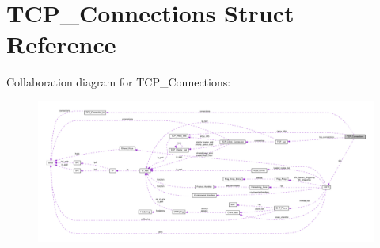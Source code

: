 \hypertarget{struct_t_c_p___connections}{\section{T\+C\+P\+\_\+\+Connections Struct Reference}
\label{struct_t_c_p___connections}
}


Collaboration diagram for T\+C\+P\+\_\+\+Connections\+:
\nopagebreak
\begin{figure}[H]
\begin{center}
\leavevmode
\includegraphics[width=350pt]{struct_t_c_p___connections__coll__graph}
\end{center}
\end{figure}
